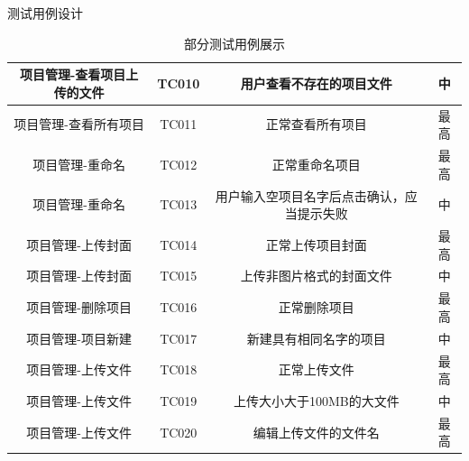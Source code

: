 \begin{frame}{测试用例设计}
\begin{table}[]
{\begin{tabular}{c|c|c|c}
                \hline
                项目管理-查看项目上传的文件 & TC010               & 用户查看不存在的项目文件                                         & 中              \\
                \hline
                项目管理-查看所有项目       & TC011               & 正常查看所有项目                                                 & 最高            \\
                \hline
                项目管理-重命名             & TC012               & 正常重命名项目                                                   & 最高            \\
                \hline
                项目管理-重命名             & TC013               & 用户输入空项目名字后点击确认，应当提示失败                       & 中              \\
                \hline
                项目管理-上传封面           & TC014               & 正常上传项目封面                                                 & 最高            \\
                \hline
                项目管理-上传封面           & TC015               & 上传非图片格式的封面文件                                         & 中              \\
                \hline
                项目管理-删除项目           & TC016               & 正常删除项目                                                     & 最高            \\
                \hline
                项目管理-项目新建           & TC017               & 新建具有相同名字的项目                                           & 中              \\
                \hline
                项目管理-上传文件           & TC018               & 正常上传文件                                                     & 最高            \\
                \hline
                项目管理-上传文件           & TC019               & 上传大小大于100MB的大文件                                        & 中              \\
                \hline
                项目管理-上传文件           & TC020               & 编辑上传文件的文件名                                             & 最高            \\
            \end{tabular}
        }
        \caption{部分测试用例展示}
        \label{tab:tech-strategy}
    \end{table}
\end{frame}

